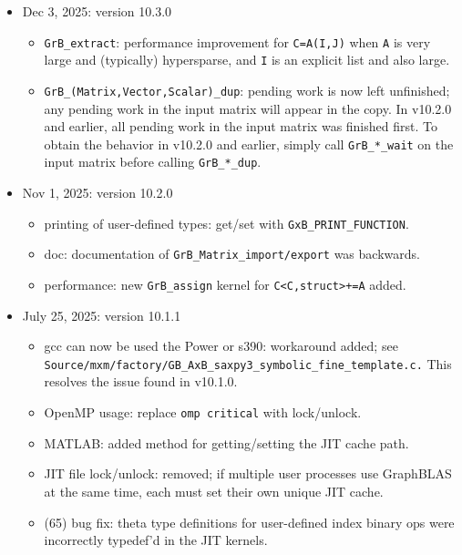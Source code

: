 \begin{itemize}
\item Dec 3, 2025: version 10.3.0

    \begin{itemize}
    \item \verb'GrB_extract': performance improvement for \verb'C=A(I,J)' when
        \verb'A' is very large and (typically) hypersparse, and \verb'I' is an
        explicit list and also large.
    \item \verb'GrB_(Matrix,Vector,Scalar)_dup':  pending work is now left
        unfinished; any pending work in the input matrix will appear in the
        copy.  In v10.2.0 and earlier, all pending work in the input matrix was
        finished first.  To obtain the behavior in v10.2.0 and earlier, simply
        call \verb'GrB_*_wait' on the input matrix before calling
        \verb'GrB_*_dup'.
    \end{itemize}

\item Nov 1, 2025: version 10.2.0

    \begin{itemize}
    \item printing of user-defined types: get/set with
        \verb'GxB_PRINT_FUNCTION'.
    \item doc: documentation of \verb'GrB_Matrix_import/export' was backwards.
    \item performance: new \verb'GrB_assign' kernel for \verb'C<C,struct>+=A'
        added.
    \end{itemize}

\item July 25, 2025: version 10.1.1

    \begin{itemize}
    \item gcc can now be used the Power or s390:  workaround added;
        see \verb'Source/mxm/factory/GB_AxB_saxpy3_symbolic_fine_template.c.'
	This resolves the issue found in v10.1.0.
    \item OpenMP usage: replace \verb'omp critical' with lock/unlock.
    \item MATLAB: added method for getting/setting the JIT cache path.
    \item JIT file lock/unlock: removed; if multiple user processes use
        GraphBLAS at the same time, each must set their own unique JIT cache.
    \item (65) bug fix: theta type definitions for user-defined index
        binary ops were incorrectly typedef'd in the JIT kernels.
    \end{itemize}


\end{itemize}
